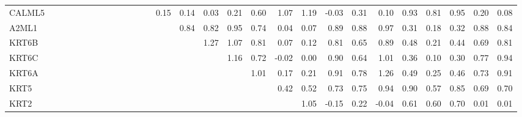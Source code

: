 \begin{longtable}{lrrrrrrrrrrrrrrrrrrrrrrrrrrr}
CALML5  &            &             &            &              &             &              &              &              &           &             &             &              &        0.15 &        0.14 &        0.03 &        0.21 &       0.60 &       1.07 &       1.19 &      -0.03 &        0.31 &        0.10 &        0.93 &         0.81 &       0.95 &          0.20 &       0.08 \\
A2ML1   &            &             &            &              &             &              &              &              &           &             &             &              &             &        0.84 &        0.82 &        0.95 &       0.74 &       0.04 &       0.07 &       0.89 &        0.88 &        0.97 &        0.31 &         0.18 &       0.32 &          0.88 &       0.84 \\
KRT6B   &            &             &            &              &             &              &              &              &           &             &             &              &             &             &        1.27 &        1.07 &       0.81 &       0.07 &       0.12 &       0.81 &        0.65 &        0.89 &        0.48 &         0.21 &       0.44 &          0.69 &       0.81 \\
KRT6C   &            &             &            &              &             &              &              &              &           &             &             &              &             &             &             &        1.16 &       0.72 &      -0.02 &       0.00 &       0.90 &        0.64 &        1.01 &        0.36 &         0.10 &       0.30 &          0.77 &       0.94 \\
KRT6A   &            &             &            &              &             &              &              &              &           &             &             &              &             &             &             &             &       1.01 &       0.17 &       0.21 &       0.91 &        0.78 &        1.26 &        0.49 &         0.25 &       0.46 &          0.73 &       0.91 \\
KRT5    &            &             &            &              &             &              &              &              &           &             &             &              &             &             &             &             &            &       0.42 &       0.52 &       0.73 &        0.75 &        0.94 &        0.90 &         0.57 &       0.85 &          0.69 &       0.70 \\
KRT2    &            &             &            &              &             &              &              &              &           &             &             &              &             &             &             &             &            &            &       1.05 &      -0.15 &        0.22 &       -0.04 &        0.61 &         0.60 &       0.70 &          0.01 &       0.01 \\

\end{longtable}
